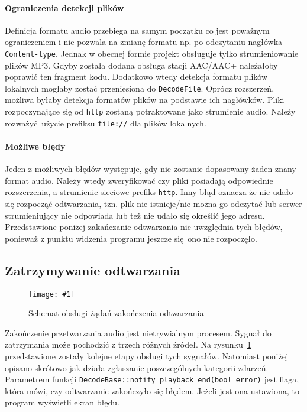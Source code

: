 \documentclass[polish]{aghengthesis}
\newcommand{\imgint}[4]{
	\begin{figure}[{#4}]
		\centering
		\texttt{[image: \#1]}
		\caption{#2}
		\label{#1}
	\end{figure}
}
\newcommand{\imgcs}[3]{\imgint{#1}{#2}{#3}{}}
\begin{document}
			\paragraph{Ograniczenia detekcji plików}
				Definicja formatu audio przebiega na samym początku co jest poważnym ograniczeniem i nie pozwala na zmianę formatu np. po odczytaniu nagłówka \lstinline|Content-type|. Jednak w obecnej formie projekt obsługuje tylko strumieniowanie plików MP3. Gdyby została dodana obsługa stacji AAC/AAC+ należałoby poprawić ten fragment kodu. Dodatkowo wtedy detekcja formatu plików lokalnych mogłaby zostać przeniesiona do \lstinline|DecodeFile|. Oprócz rozszerzeń, możliwa byłaby detekcja formatów plików na podstawie ich nagłówków. Pliki rozpoczynające się od \lstinline|http| zostaną potraktowane jako strumienie audio. Należy rozważyć użycie prefiksu \lstinline|file://| dla plików lokalnych.
			
			\paragraph{Możliwe błędy}
				Jeden z możliwych błędów występuje, gdy nie zostanie dopasowany żaden znany format audio. Należy wtedy zweryfikować czy pliki posiadają odpowiednie rozszerzenia, a strumienie sieciowe prefiks \lstinline|http|. Inny błąd oznacza że nie udało się rozpocząć odtwarzania, tzn. plik nie istnieje/nie można go odczytać lub serwer strumieniujący nie odpowiada lub też nie udało się określić jego adresu. Przedstawione poniżej zakańczanie odtwarzania nie uwzględnia tych błędów, ponieważ z punktu widzenia programu jeszcze się ono nie rozpoczęło.
		
		\subsection{Zatrzymywanie odtwarzania}
			\imgcs{3/PicoRadio-stop}{Schemat obsługi żądań zakończenia odtwarzania}{1}
			Zakończenie przetwarzania audio jest nietrywialnym procesem. Sygnał do zatrzymania może pochodzić z trzech różnych źródeł. Na rysunku~\ref{3/PicoRadio-stop} przedstawione zostały kolejne etapy obsługi tych sygnałów. Natomiast poniżej opisano skrótowo jak działa zgłaszanie poszczególnych kategorii zdarzeń. 
			$ $\\
			
			Parametrem funkcji \lstinline|DecodeBase::notify_playback_end(bool error)| jest flaga, która mówi, czy odtwarzanie zakończyło się błędem. Jeżeli jest ona ustawiona, to program wyświetli ekran błędu.
			
\end{document}
